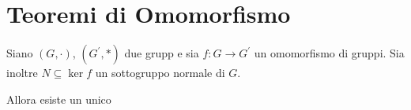 \section{Teoremi di Omomorfismo}

\begin{theorem}
    Siano $(G, \cdot)$, $(G^\prime, *)$ due grupp e sia $f : G \to G^\prime$ un omomorfismo di gruppi. Sia inoltre $N \subseteq \ker f$ un sottogruppo normale di $G$.

    Allora esiste un unico 

\end{theorem}